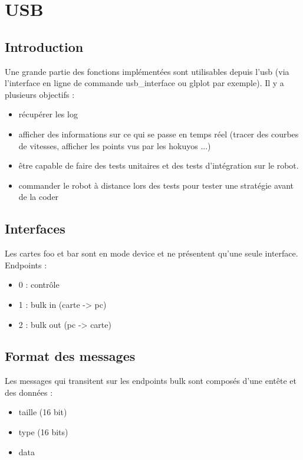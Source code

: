 \chapter{USB}

\section{Introduction}

Une grande partie des fonctions implémentées sont utilisables depuis l'usb (via l'interface en ligne de commande usb\_interface ou glplot par exemple). Il y a plusieurs objectifs :
\begin{itemize}
\item récupérer les log
\item afficher des informations sur ce qui se passe en temps réel (tracer des courbes de vitesses, afficher les points vus par les hokuyos ...)
\item être capable de faire des tests unitaires et des tests d'intégration sur le robot.
\item commander le robot à distance lors des tests pour tester une stratégie avant de la coder
\end{itemize}

\section{Interfaces}
Les cartes foo et bar sont en mode device et ne présentent qu'une seule interface.
Endpoints :
\begin{itemize}
\item 0 : contrôle
\item 1 : bulk in (carte -> pc)
\item 2 : bulk out (pc -> carte)
\end{itemize}

\section{Format des messages}

Les messages qui transitent sur les endpoints bulk sont composés d'une entête et des données :

\begin{itemize}
\item taille (16 bit)
\item type (16 bits)
\item data
\end{itemize}

\clearpage
